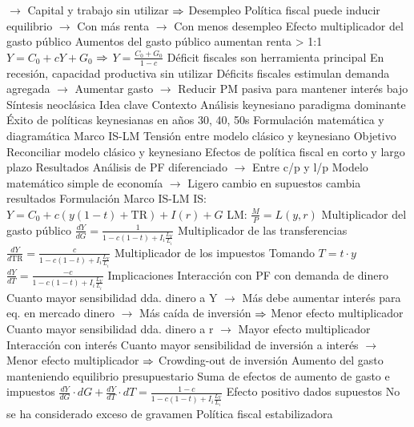 \documentclass{nuevotema}
\begin{document}
\begin{esquemal}
				\4[] $\to$ Capital y trabajo sin utilizar
				\4[] $\then$ Desempleo
				\4[] Política fiscal puede inducir equilibrio
				\4[] $\to$ Con más renta
				\4[] $\to$ Con menos desempleo
				\4 Efecto multiplicador del gasto público
				\4[] Aumentos del gasto público aumentan renta > 1:1
				\4[] $Y = C_0 + c Y + G_0$
				\4[] $\then$ $Y = \frac{C_0 + G_0}{1-c}$
				\4 Déficit fiscales son herramienta principal
				\4[] En recesión, capacidad productiva sin utilizar
				\4[] Déficits fiscales estimulan demanda agregada
				\4[] $\to$ Aumentar gasto
				\4[] $\to$ Reducir
				\4 PM pasiva para mantener interés bajo
		\2 Síntesis neoclásica
			\3 Idea clave
				\4 Contexto
				\4[] Análisis keynesiano paradigma dominante
				\4[] Éxito de políticas keynesianas en años 30, 40, 50s
				\4[] Formulación matemática y diagramática
				\4[] Marco IS-LM
				\4[] Tensión entre modelo clásico y keynesiano
				\4 Objetivo
				\4[] Reconciliar modelo clásico y keynesiano
				\4[] Efectos de política fiscal en corto y largo plazo
				\4 Resultados
				\4[] Análisis de PF diferenciado
				\4[] $\to$ Entre c/p y l/p
				\4[] Modelo matemático simple de economía
				\4[] $\to$ Ligero cambio en supuestos cambia resultados
			\3 Formulación
				\4 Marco IS-LM
				\4 IS: $Y = C_0 + c(y(1-t)+\text{TR})+I(r) + G$
				\4 LM: $\frac{M}{P} = L(y,r)$
				\4 Multiplicador del gasto público
				\4[] $\frac{d Y}{d G} = \frac{1}{1-c(1-t) + I_i \frac{L_Y}{L_i}}$
				\4 Multiplicador de las transferencias
				\4[] $\frac{d Y}{d \text{TR}} = \frac{c}{1-c(1-t) + I_i \frac{L_Y}{L_i}}$
				\4 Multiplicador de los impuestos
				\4[] Tomando $T=t\cdot y$
				\4[] $\frac{d Y}{d T} = \frac{-c}{1-c(1-t) + I_i \frac{L_Y}{L_i}}$
			\3 Implicaciones
				\4 Interacción con PF con demanda de dinero
				\4[] Cuanto mayor sensibilidad dda. dinero a Y
				\4[] $\to$ Más debe aumentar interés para eq. en mercado dinero
				\4[] $\to$ Más caída de inversión
				\4[] $\then$ Menor efecto multiplicador
				\4[]  Cuanto mayor sensibilidad dda. dinero a r
				\4[] $\to$ Mayor efecto multiplicador
				\4 Interacción con interés
				\4[] Cuanto mayor sensibilidad de inversión a interés
				\4[] $\to$ Menor efecto multiplicador
				\4[] $\then$ Crowding-out de inversión
				\4 Aumento del gasto manteniendo equilibrio presupuestario
				\4[] Suma de efectos de aumento de gasto e impuestos
				\4[] $\frac{d Y}{d G} \cdot d G + \frac{d Y}{d T} \cdot d T = \frac{1-c}{1-c(1-t) + I_i \frac{L_Y}{L_i}}$
				\4[$\then$] Efecto positivo dados supuestos
				\4[$\then$] No se ha considerado exceso de gravamen
				\4 Política fiscal estabilizadora

\end{esquemal}
\end{document}

